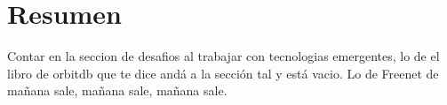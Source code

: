 \section{Resumen}

Contar en la seccion de desafios al trabajar con tecnologias emergentes, lo de el libro de orbitdb que te dice andá a la sección tal y está vacio. Lo de Freenet de mañana sale, mañana sale, mañana sale.
